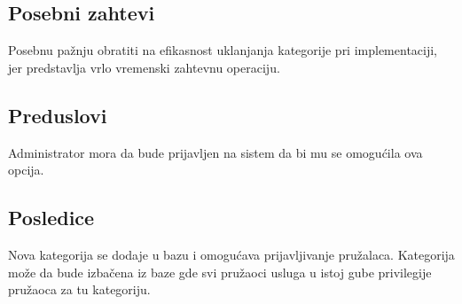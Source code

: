 \documentclass[a4paper,12pt]{report}
\begin{document}
		\subsection{Posebni zahtevi}
			Posebnu pažnju obratiti na efikasnost uklanjanja kategorije pri implementaciji, jer predstavlja vrlo vremenski zahtevnu operaciju.
		\subsection{Preduslovi}
			Administrator mora da bude prijavljen na sistem da bi mu se omogućila ova opcija.
		\subsection{Posledice}
			Nova kategorija se dodaje u bazu i omogućava prijavljivanje pružalaca.
			Kategorija može da bude izbačena iz baze gde svi pružaoci usluga u istoj gube privilegije pružaoca za tu kategoriju.
\end{document}
